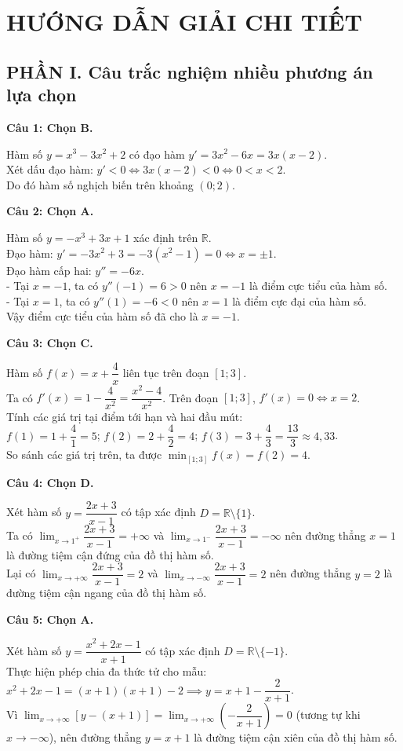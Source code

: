 \documentclass[12pt,a4paper]{article}
\newcommand{\loigiai}[1]{\par\medskip\Needspace{4\baselineskip}\noindent\textbf{#1}\par\nobreak}
\begin{document}
\newpage
\section*{\large HƯỚNG DẪN GIẢI CHI TIẾT}

\subsection*{PHẦN I. Câu trắc nghiệm nhiều phương án lựa chọn}

\loigiai{Câu 1: Chọn B.}
Hàm số $y=x^3-3x^2+2$ có đạo hàm $y'=3x^2-6x=3x(x-2)$.\\
Xét dấu đạo hàm: $y'<0 \iff 3x(x-2)<0 \iff 0<x<2$.\\
Do đó hàm số nghịch biến trên khoảng $(0;2)$.

\loigiai{Câu 2: Chọn A.}
Hàm số $y=-x^3+3x+1$ xác định trên $\mathbb{R}$.\\
Đạo hàm: $y'=-3x^2+3=-3(x^2-1)=0 \iff x=\pm 1$.\\
Đạo hàm cấp hai: $y''=-6x$.\\
- Tại $x=-1$, ta có $y''(-1)=6>0$ nên $x=-1$ là điểm cực tiểu của hàm số.\\
- Tại $x=1$, ta có $y''(1)=-6<0$ nên $x=1$ là điểm cực đại của hàm số.\\
Vậy điểm cực tiểu của hàm số đã cho là $x=-1$.

\loigiai{Câu 3: Chọn C.}
Hàm số $f(x)=x+\dfrac{4}{x}$ liên tục trên đoạn $[1;3]$.\\
Ta có $f'(x)=1-\dfrac{4}{x^2}=\dfrac{x^2-4}{x^2}$. Trên đoạn $[1;3]$, $f'(x)=0 \iff x=2$.\\
Tính các giá trị tại điểm tới hạn và hai đầu mút:\\
$f(1)=1+\dfrac{4}{1}=5$; \quad $f(2)=2+\dfrac{4}{2}=4$; \quad $f(3)=3+\dfrac{4}{3}=\dfrac{13}{3}\approx 4{,}33$.\\
So sánh các giá trị trên, ta được $\min_{[1;3]} f(x)=f(2)=4$.

\loigiai{Câu 4: Chọn D.}
Xét hàm số $y=\dfrac{2x+3}{x-1}$ có tập xác định $D=\mathbb{R}\setminus\{1\}$.\\
Ta có $\lim_{x\to 1^+} \dfrac{2x+3}{x-1}=+\infty$ và $\lim_{x\to 1^-} \dfrac{2x+3}{x-1}=-\infty$ nên đường thẳng $x=1$ là đường tiệm cận đứng của đồ thị hàm số.\\
Lại có $\lim_{x\to +\infty} \dfrac{2x+3}{x-1}=2$ và $\lim_{x\to -\infty} \dfrac{2x+3}{x-1}=2$ nên đường thẳng $y=2$ là đường tiệm cận ngang của đồ thị hàm số.

\loigiai{Câu 5: Chọn A.}
Xét hàm số $y=\dfrac{x^2+2x-1}{x+1}$ có tập xác định $D=\mathbb{R}\setminus\{-1\}$.\\
Thực hiện phép chia đa thức tử cho mẫu:\\
$x^2+2x-1=(x+1)(x+1)-2 \implies y=x+1-\dfrac{2}{x+1}$.\\
Vì $\lim_{x\to +\infty} [y-(x+1)] = \lim_{x\to +\infty} \left(-\dfrac{2}{x+1}\right)=0$ (tương tự khi $x\to -\infty$), nên đường thẳng $y=x+1$ là đường tiệm cận xiên của đồ thị hàm số.
\end{document}
